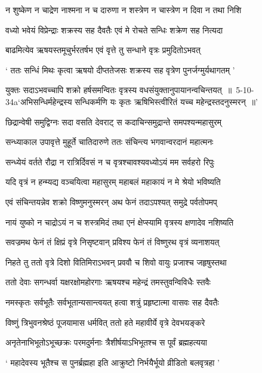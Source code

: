 \twolineshloka
{न शुष्केण न चाद्रेण नाश्मना न च दारुणा}
{न शस्त्रेण न चास्त्रेण न दिवा न तथा निशि}


\twolineshloka
{वध्यो भवेयं विप्रेन्द्राः शक्रस्य सह दैवतैः}
{एवं मे रोचते सन्धिः शक्रेण सह नित्यदा}


\twolineshloka
{बाढमित्येव ऋषयस्तमूचुर्भरतर्षभ}
{एवं वृत्ते तु सन्धाने वृत्रः प्रमुदितोऽभवत्}


\twolineshloka
{` ततः सन्धिं मिथः कृत्वा ऋषयो दीप्ततेजसः}
{शक्रस्य सह वृत्रेण पुनर्जग्मुर्यथागतम् '}


\threelineshloka
{युक्तः सदाऽभवच्चापि शक्रो हर्षसमन्वितः}
{वृत्रस्य वधसंयुक्तानुपायानन्वचिन्तयत् ॥ 5-10-34a`अभिसन्धिर्महेन्द्रस्य सन्धिकर्मणि यः कृतः}
{ऋषिभिस्त्वीरितं यच्च महेन्द्रस्तदनुस्मरन् ॥'}


\twolineshloka
{छिद्रान्वेषी समुद्विग्नः सदा वसति देवराट्}
{स कदाचिन्समुद्रान्ते समपश्यन्महासुरम्}


\twolineshloka
{सन्ध्याकाल उपावृत्ते मुहूर्ते चातिदारुणे}
{ततः संचिन्त्य भगवान्वरदानं महात्मनः}


\twolineshloka
{सन्ध्येयं वर्तते रौद्रा न रात्रिर्दिवसं न च}
{वृत्रश्चावश्यवध्योऽयं मम सर्वहरो रिपुः}


\twolineshloka
{यदि वृत्रं न हन्म्यद्य वञ्चयित्वा महासुरम्}
{महाबलं महाकायं न मे श्रेयो भविष्यति}


\twolineshloka
{एवं संचिन्तयन्नेव शक्रो विष्णुमनुस्मरन्}
{अथ फेनं तदाऽपश्यत् समुद्रे पर्वतोपमप्}


\twolineshloka
{नायं युष्को न चाद्रोऽयं न च शस्त्रमिदं तथा}
{एनं क्षेप्स्यामि वृत्रस्य क्षणादेव नशिष्यति}


\twolineshloka
{सवज्रमथ फेनं तं क्षिप्रं वृत्रे निसृष्टवान्}
{प्रविश्य फेनं तं विष्णुरथ वृत्रं व्यनाशयत्}


\twolineshloka
{निहते तु ततो वृत्रे दिशो वितिमिराऽभवन्}
{प्रववौ च शिवो वायुः प्रजाश्च जहृषुस्तथा}


\twolineshloka
{ततो देवाः सगन्धर्वा यक्षरक्षोमहोरगाः}
{ऋषयश्च महेन्द्रं तमस्तुवन्विविधैः स्तवैः}


\twolineshloka
{नमस्कृतः सर्वभूतैः सर्वभूतान्यसान्त्वयत्}
{हत्वा शत्रुं प्रहृष्टात्मा वासवः सह दैवतैः}


\twolineshloka
{विष्णुं त्रिभुवनश्रेष्ठं पूजयामास धर्मवित्}
{ततो हते महावीर्ये वृत्रे देवभयङ्करे}


\twolineshloka
{अनृतेनाभिभूतोऽभूच्छक्रः परमदुर्मनाः}
{त्रैशीर्षयाऽभिभूतश्च स पूर्वं ब्रह्महत्यया}


\twolineshloka
{` महादेवस्य भूतैश्च स पुनर्ब्रह्महा इति}
{आक्रुष्टो निर्भयैर्भूयो व्रीडितो बलवृत्रहा '}


